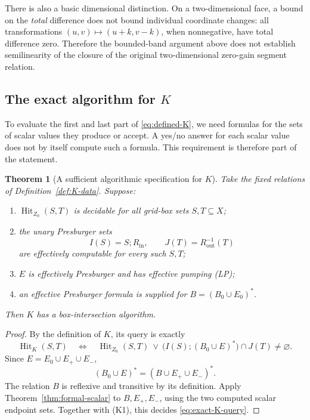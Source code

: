 \documentclass[11pt,a4paper]{article}
\newtheorem{theorem}{Theorem}[section]
\theoremstyle{definition}
\theoremstyle{remark}
\newcommand{\Hit}{\operatorname{Hit}}
\begin{document}
There is also a basic dimensional distinction. On a two-dimensional
face, a bound on the \emph{total} difference does not bound individual
coordinate changes: all transformations
\((u,v)\mapsto(u+k,v-k)\), when nonnegative, have total difference
zero. Therefore the bounded-band argument above does not establish
semilinearity of the closure of the original two-dimensional
zero-gain segment relation.

\subsection[The exact algorithm for K]{The exact algorithm for \(K\)}

To evaluate the first and last part of
\eqref{eq:defined-K}, we need formulas for the sets of scalar
values they produce or accept. A yes/no answer for each scalar value
does not by itself compute such a formula. This requirement is
therefore part of the statement.

\begin{theorem}[A sufficient algorithmic specification for \(K\)]
\label{thm:K-algorithm}
Take the fixed relations of Definition~\ref{def:K-data}. Suppose:
\begin{enumerate}[label=\textnormal{(K\arabic*)},leftmargin=*]
\item \(\Hit_{Z_0}(S,T)\) is decidable for all grid-box sets
      \(S,T\subseteq X\);
\item the unary Presburger sets
\[
 I(S)=S;R_{\mathrm{in}},\qquad
 J(T)=R_{\mathrm{out}}^{-1}(T)
\]
      are effectively computable for every such \(S,T\);
\item \(E\) is effectively Presburger and has effective pumping (LP);
\item an effective Presburger formula is supplied for
      \(B=(B_0\cup E_0)^*\).
\end{enumerate}
Then \(K\) has a box-intersection algorithm.
\end{theorem}
\begin{proof}
By the definition of \(K\), its query is exactly
\begin{equation}
 \Hit_K(S,T)
 \quad\Longleftrightarrow\quad
 \Hit_{Z_0}(S,T)\ \lor\
 \bigl(I(S);(B_0\cup E)^*\bigr)\cap J(T)\ne\varnothing.
 \label{eq:exact-K-query}
\end{equation}
Since \(E=E_0\cup E_+\cup E_-\),
\[
 (B_0\cup E)^*=(B\cup E_+\cup E_-)^*.
\]
The relation \(B\) is reflexive and transitive by its definition.
Apply Theorem~\ref{thm:formal-scalar} to \(B,E_+,E_-\), using
the two computed scalar endpoint sets. Together with (K1), this
decides \eqref{eq:exact-K-query}.
\end{proof}
\end{document}
